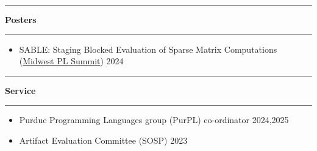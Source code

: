 \documentclass[10pt, letterpaper]{article}
\newlength{\SectionAbove} %
\newlength{\SectionBelow} %
\newlength{\EntrySep}     %
\newif\ifEntryPending
\newcommand{\Section}[1]{%
    \par
    \ifEntryPending\vskip-\EntrySep\global\EntryPendingfalse\fi
    \Needspace*{3\baselineskip}%
    \vspace{\SectionAbove}%
    \Line\par
    \textbf{\fontsize{13}{13}\selectfont #1}\par
    \vspace{-7pt}%
    \Line\par
    \vspace{\SectionBelow}%
}
\newcommand{\Line}{%
    \noindent\rule{\textwidth}{0.4pt}}
\newenvironment{tightitemize}
    {\begin{itemize}[topsep=0pt, partopsep=0pt, parsep=0pt, itemsep=1pt]}
    {\end{itemize}}
\begin{document}
\Section{Posters}
\begin{tightitemize}
\item SABLE: Staging Blocked Evaluation of Sparse Matrix Computations (\href{https://pl.cs.uchicago.edu/PLSummit/2024/}{Midwest PL Summit}) \hfill{2024}
\end{tightitemize}

\Section{Service}
\begin{tightitemize}
\item Purdue Programming Languages group (PurPL) co-ordinator \hfill 2024,2025
\item Artifact Evaluation Committee (SOSP) \hfill 2023
\end{tightitemize}
\end{document}
